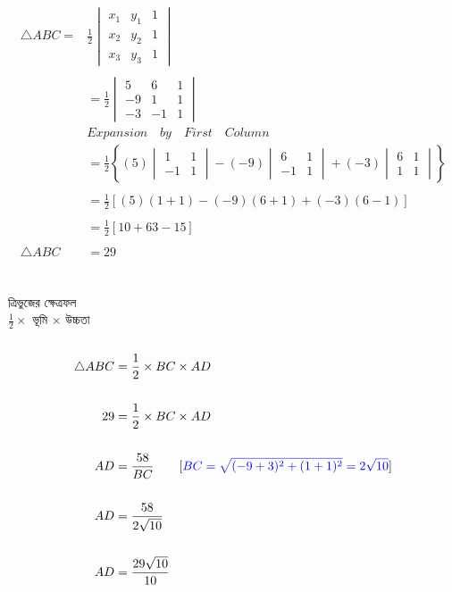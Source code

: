 \documentclass{article}
\begin{document}
\begin{align*}
	\triangle ABC=	&\frac{1}{2}\begin{vmatrix}
		x_1 &	y_1 & 1\\
		x_2 & y_2 & 1\\
		x_3 & y_3 & 1
	\end{vmatrix}\\
	\\
	&=\frac{1}{2}\begin{vmatrix}
		5 & 6 & 1\\
		-9 & 1 & 1\\
		-3 & -1 & 1
	\end{vmatrix}\\
	&\boxed{Expansion \quad by \quad  First \quad  Column}\\ 
	&=\frac{1}{2}\left\{(5)\begin{vmatrix}
		1 & 1\\
		-1 & 1
	\end{vmatrix}-(-9)\begin{vmatrix}
		6 & 1\\
		-1 & 1
	\end{vmatrix}+(-3)\begin{vmatrix}
		6 & 1\\
		1 & 1
	\end{vmatrix}\right\}\\
	\\
	&=\frac{1}{2}\left[(5)(1+1)-(-9)(6+1)+(-3)(6-1)\right]\\
	\\
	&=\frac{1}{2}\left[10+63-15\right]\\
	\\
	\triangle ABC	&=29
\end{align*}
\\ 
	\\
ত্রিভুজের ক্ষেত্রফল\\
$\frac{1}{2}\times$	ভূমি $\times$  উচ্চতা\\
\\
\begin{align*}
	\triangle ABC &= \frac{1}{2}\times BC \times AD\\
	\\
29  &= \frac{1}{2}\times BC \times AD\\
\\
AD&= \frac{58}{BC}\qquad [\textcolor{blue}{BC=\sqrt{(-9+3)^2+(1+1)^2}=2\sqrt{10}}]\\
\\
AD&= \frac{58}{2\sqrt{10}}\\
\\
AD&= \frac{29\sqrt{10}}{10}
\end{align*}
\end{document}
